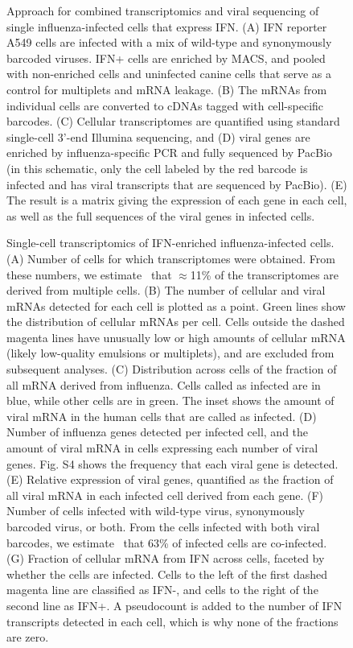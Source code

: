 \documentclass[]{article}
\begin{document}
\begin{figure}
\caption{
Approach for combined transcriptomics and viral sequencing of single influenza-infected cells that express IFN.
(A)
IFN reporter A549 cells are infected with a mix of wild-type and synonymously barcoded viruses.
IFN+ cells are enriched by MACS, and pooled with non-enriched cells and uninfected canine cells that serve as a control for multiplets and mRNA leakage.
(B)
The mRNAs from individual cells are converted to cDNAs tagged with cell-specific barcodes.
(C)
Cellular transcriptomes are quantified using standard single-cell 3'-end Illumina sequencing, and 
(D)
viral genes are enriched by influenza-specific PCR and fully sequenced by PacBio (in this schematic, only the cell labeled by the red barcode is infected and has viral transcripts that are sequenced by PacBio).
(E)
The result is a matrix giving the expression of each gene in each cell, as well as the full sequences of the viral genes in infected cells.
}
\end{figure}

\begin{figure}
\caption{
Single-cell transcriptomics of IFN-enriched influenza-infected cells.
(A) 
Number of cells for which transcriptomes were obtained.
From these numbers, we estimate~\cite{bloom2018estimating} that $\approx$11\% of the transcriptomes are derived from multiple cells. 
(B) The number of cellular and viral mRNAs detected for each cell is plotted as a point.
Green lines show the distribution of cellular mRNAs per cell.
Cells outside the dashed magenta lines have unusually low or high amounts of cellular mRNA (likely low-quality emulsions or multiplets), and are excluded from subsequent analyses.
(C) Distribution across cells of the fraction of all mRNA derived from influenza.
Cells called as infected are in blue, while other cells are in green.
The inset shows the amount of viral mRNA in the human cells that are called as infected.
(D) Number of influenza genes detected per infected cell, and the amount of viral mRNA in cells expressing each number of viral genes.
Fig. S4 shows the frequency that each viral gene is detected.
(E) Relative expression of viral genes, quantified as the fraction of all viral mRNA in each infected cell derived from each gene.
(F) Number of cells infected with wild-type virus, synonymously barcoded virus, or both.
From the cells infected with both viral barcodes, we estimate~\cite{bloom2018estimating} that 63\% of infected cells are co-infected.
(G) Fraction of cellular mRNA from IFN across cells, faceted by whether the cells are infected.
Cells to the left of the first dashed magenta line are classified as IFN-, and cells to the right of the second line as IFN+.
A pseudocount is added to the number of IFN transcripts detected in each cell, which is why none of the fractions are zero.
}
\end{figure}
\end{document}
